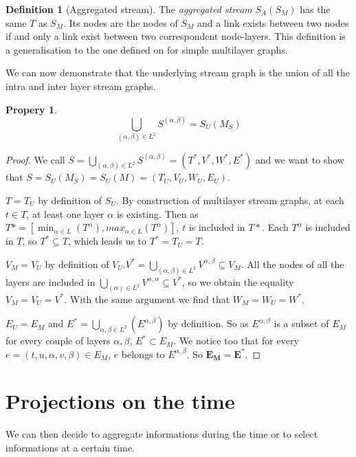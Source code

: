 \documentclass[dvipsnames,a4paper,11pt]{article}
\newtheorem{prop}{Propery}
\theoremstyle{definition}
\newtheorem{defn}{Definition}
\theoremstyle{remark}
\theoremstyle{remark}
\begin{document}
	\begin{defn}[Aggregated stream]
		
		The {\em aggregated stream} $S_A(S_M)$ has the same $T$ as $S_M$. Its nodes are the nodes of $S_M$ and a link exists between two nodes if and only a link exist between two correspondent node-layers.	This definition is a generalisation to the one defined on \cite{mldd} for simple multilayer graphs.
	
	\end{defn}
	
	We can now demonstrate that the underlying stream graph is the union of all the intra and inter layer stream graphs.
	
	\begin{prop}
		\[
			\bigcup_{(\alpha,\beta) \in L^2} S^{(\alpha,\beta)} = S_U(M_S)
		\]
	\end{prop}
	\begin{proof}
	We call $S=\bigcup_{(\alpha,\beta) \in L^2} S^{(\alpha,\beta)}=(T^{*},V^{*},W^{*},E^{*})$ and we want to show that $S=S_U(M_S)=S_U(M) = (T_U,V_U,W_U,E_U)$.
	
	$T=T_U$ by definition of $S_U$. By construction of multilayer stream graphs, at each $t\in T$, at least one layer $\alpha$ is existing. Then as $T* = [\min_{\alpha \in L} (T^{\alpha}),max_{\alpha \in L} (T^{\alpha})]$, $t$ is included in $T*$. Each $T^{\alpha}$ is included in $T$, so $T^* \subseteq T$, which leads us to $T^*=T_U=T$.
	
	$V_M = V_U$ by definition of $V_U$.$V^{*}=\bigcup_{(\alpha,\beta) \in L^2} V^{\alpha,\beta} \subseteq V_M$. All the nodes of all the layers are included in $\bigcup_{(\alpha) \in L^2} V^{\alpha,\alpha} \subseteq V^{*}$, so we obtain the equality $V_M=V_U=V^*$.
	With the same argument we find that $W_M=W_U=W^*$.
	
	$E_U=E_M$ and $E^{*}=\bigcup_{\alpha,\beta \in L^2}(E^{\alpha,\beta})$ by definition. So as $E^{\alpha,\beta}$ is a subset of $E_M$ for every couple of layers $\alpha,\beta$, $E^{*} \subset E_M$. We notice too that for every $e =(t,u,\alpha,v,\beta) \in E_M$, $e$ belongs to $E^{\alpha,\beta}$. So $\mathbf{E_M=E^{*}}$.
					
	\end{proof}
	
	
	\section{Projections on the time}
	
	We can then decide to aggregate informations during the time or to select informations at a certain time.
	
\end{document}
